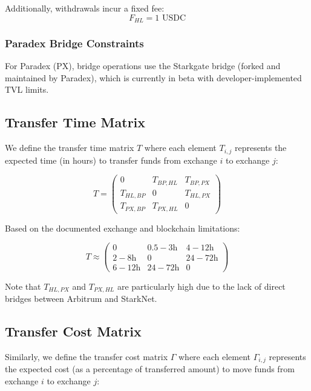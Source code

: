 \documentclass{article}
\begin{document}
Additionally, withdrawals incur a fixed fee:
\begin{equation}
F_{HL} = 1 \text{ USDC}
\end{equation}

\subsubsection{Paradex Bridge Constraints}

For Paradex (PX), bridge operations use the Starkgate bridge (forked and maintained by Paradex), which is currently in beta with developer-implemented TVL limits.

\subsection{Transfer Time Matrix}

We define the transfer time matrix $T$ where each element $T_{i,j}$ represents the expected time (in hours) to transfer funds from exchange $i$ to exchange $j$:

\begin{equation}
T = \begin{pmatrix}
0 & T_{BP,HL} & T_{BP,PX} \\
T_{HL,BP} & 0 & T_{HL,PX} \\
T_{PX,BP} & T_{PX,HL} & 0
\end{pmatrix}
\end{equation}

Based on the documented exchange and blockchain limitations:

\begin{equation}
T \approx \begin{pmatrix}
0 & 0.5-3\text{h} & 4-12\text{h} \\
2-8\text{h} & 0 & 24-72\text{h} \\
6-12\text{h} & 24-72\text{h} & 0
\end{pmatrix}
\end{equation}

Note that $T_{HL,PX}$ and $T_{PX,HL}$ are particularly high due to the lack of direct bridges between Arbitrum and StarkNet.

\subsection{Transfer Cost Matrix}

Similarly, we define the transfer cost matrix $\Gamma$ where each element $\Gamma_{i,j}$ represents the expected cost (as a percentage of transferred amount) to move funds from exchange $i$ to exchange $j$:
\end{document}
